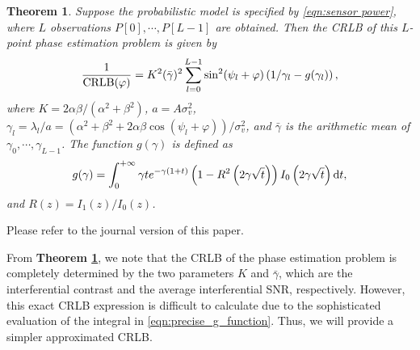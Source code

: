 \documentclass[conference,10pt,twocolumn]{IEEEtran}
\newtheorem{theorem}{\bf Theorem}
\theoremstyle{nonumberplain}
\begin{document}
    \begin{theorem}\label{thm:precise CRLB}
        Suppose the probabilistic model is specified by \eqref{eqn:sensor power}, where $L$ observations $P[0],\cdots,P[L-1]$ are obtained. Then the CRLB of this $L$-point phase estimation problem is given by
        \begin{equation}
            \frac{1}{{\rm CRLB}(\varphi)} = K^2(\bar{\gamma})^2 \sum_{l=0}^{L-1}\sin^2(\psi_l+\varphi)\left(1/\gamma_l-g(\gamma_l)\right),
            \label{eqn:precise_CRLB}
        \end{equation}
        where $K=2\alpha\beta/(\alpha^2+\beta^2)$, $a=A\sigma_v^2$, $\gamma_l=\lambda_l/a=\left(\alpha^2+\beta^2+2\alpha\beta \cos(\psi_l+\varphi)\right)/\sigma_v^2$, and $\bar{\gamma}$ is the arithmetic mean of $\gamma_0,\cdots,\gamma_{L-1}$. The function $g(\gamma)$ is defined as 
        \begin{equation*}
                g(\gamma)  = \int_{0}^{+\infty}\gamma t e^{-\gamma(1+t)}\left(1-R^2\left(2\gamma\sqrt{t}\right)\right)I_0\left(2\gamma\sqrt{t}\right) {\rm d}t,
            \label{eqn:precise_g_function}
        \end{equation*}
        and $R(z)=I_1(z)/I_0(z)$. 
    \end{theorem}
    \begin{IEEEproof}
        Please refer to the journal version of this paper. 
    \end{IEEEproof}

    From \textbf{Theorem \ref{thm:precise CRLB}}, we note that the CRLB of the phase estimation problem is completely determined by the two parameters $K$ and $\bar{\gamma}$, which are the interferential contrast and the average interferential SNR, respectively. 
    However, this exact CRLB expression is difficult to calculate due to the sophisticated evaluation of the integral in \eqref{eqn:precise_g_function}.
    Thus, we will provide a simpler approximated CRLB.
    
\end{document}
